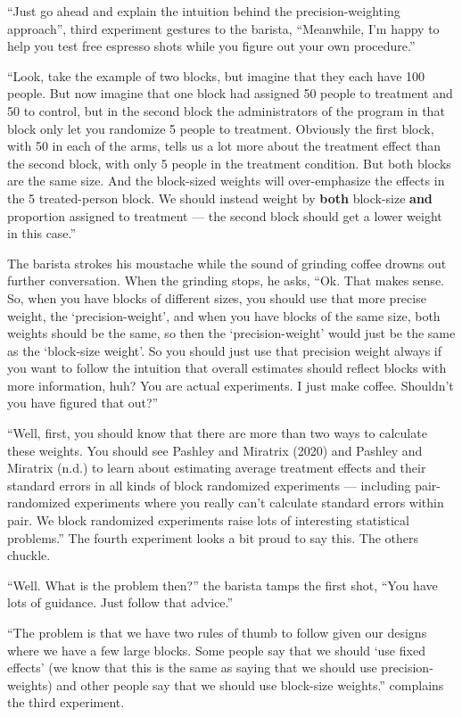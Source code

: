 \documentclass[
]{article}
\begin{document}
``Just go ahead and explain the intuition behind the precision-weighting approach'', third experiment gestures to the barista, ``Meanwhile, I'm happy to help you test free espresso shots while you figure out your own procedure.''

``Look, take the example of two blocks, but imagine that they each have 100 people. But now imagine that one block had assigned 50 people to treatment and 50 to control, but in the second block the administrators of the program in that block only let you randomize 5 people to treatment. Obviously the first block, with 50 in each of the arms, tells us a lot more about the treatment effect than the second block, with only 5 people in the treatment condition. But both blocks are the same size. And the block-sized weights will over-emphasize the effects in the 5 treated-person block. We should instead weight by \textbf{both} block-size \textbf{and} proportion assigned to treatment --- the second block should get a lower weight in this case.''

The barista strokes his moustache while the sound of grinding coffee drowns out further conversation. When the grinding stops, he asks, ``Ok. That makes sense. So, when you have blocks of different sizes, you should use that more precise weight, the `precision-weight', and when you have blocks of the same size, both weights should be the same, so then the `precision-weight' would just be the same as the `block-size weight'. So you should just use that precision weight always if you want to follow the intuition that overall estimates should reflect blocks with more information, huh? You are actual experiments. I just make coffee. Shouldn't you have figured that out?''

``Well, first, you should know that there are more than two ways to calculate these weights. You should see Pashley and Miratrix (2020) and Pashley and Miratrix (n.d.) to learn about estimating average treatment effects and their standard errors in all kinds of block randomized experiments --- including pair-randomized experiments where you really can't calculate standard errors within pair. We block randomized experiments raise lots of interesting statistical problems.'' The fourth experiment looks a bit proud to say this. The others chuckle.

``Well. What is the problem then?'' the barista tamps the first shot, ``You have lots of guidance. Just follow that advice.''

``The problem is that we have two rules of thumb to follow given our designs where we have a few large blocks. Some people say that we should `use fixed effects' (we know that this is the same as saying that we should use precision-weights) and other people say that we should use block-size weights.'' complains the third experiment.
\end{document}
